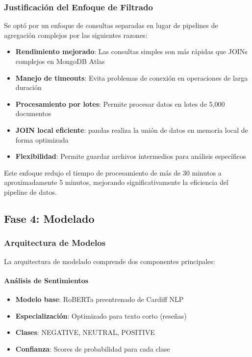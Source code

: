 \documentclass[12pt,a4paper,twoside,openany]{book}
\begin{document}
\subsubsection{Justificación del Enfoque de Filtrado}

Se optó por un enfoque de consultas separadas en lugar de pipelines de agregación complejos por las siguientes razones:

\begin{itemize}
    \item \textbf{Rendimiento mejorado}: Las consultas simples son más rápidas que JOINs complejos en MongoDB Atlas
    \item \textbf{Manejo de timeouts}: Evita problemas de conexión en operaciones de larga duración
    \item \textbf{Procesamiento por lotes}: Permite procesar datos en lotes de 5,000 documentos
    \item \textbf{JOIN local eficiente}: pandas realiza la unión de datos en memoria local de forma optimizada
    \item \textbf{Flexibilidad}: Permite guardar archivos intermedios para análisis específicos
\end{itemize}

Este enfoque redujo el tiempo de procesamiento de más de 30 minutos a aproximadamente 5 minutos, mejorando significativamente la eficiencia del pipeline de datos.

\subsection{Fase 4: Modelado}

\subsubsection{Arquitectura de Modelos}

La arquitectura de modelado comprende dos componentes principales:

\paragraph{Análisis de Sentimientos}
\begin{itemize}
    \item \textbf{Modelo base}: RoBERTa preentrenado de Cardiff NLP
    \item \textbf{Especialización}: Optimizado para texto corto (reseñas)
    \item \textbf{Clases}: NEGATIVE, NEUTRAL, POSITIVE
    \item \textbf{Confianza}: Scores de probabilidad para cada clase
\end{itemize}
\end{document}
